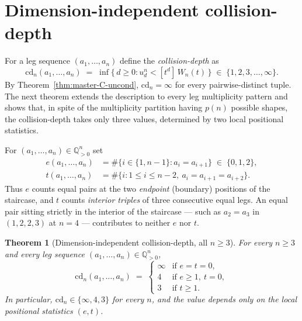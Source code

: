 \documentclass[11pt,a4paper]{article}
\newtheorem{theorem}{Theorem}
\theoremstyle{remark}
\theoremstyle{plain}
\begin{document}
\section{Dimension-independent collision-depth}\label{sec:cd}

For a leg sequence $(a_1, \ldots, a_n)$ define the
\emph{collision-depth} as
\[
\mathrm{cd}_n(a_1, \ldots, a_n)
\;=\; \inf\bigl\{\, d \ge 0 : u_d^n < [t^d]\, W_n(t) \,\bigr\}
\;\in\; \{1, 2, 3, \ldots, \infty\}.
\]
By Theorem~\ref{thm:master-C-uncond}, $\mathrm{cd}_n = \infty$ for
every pairwise-distinct tuple.  The next theorem extends the
description to every leg multiplicity pattern and shows that, in
spite of the multiplicity partition having $p(n)$ possible shapes,
the collision-depth takes only three values, determined by two
local positional statistics.

For $(a_1, \ldots, a_n) \in \mathbb{Q}_{>0}^n$ set
\begin{align*}
e(a_1, \ldots, a_n) &= \#\bigl\{ i \in \{1, n-1\} : a_i = a_{i+1}\bigr\}
\;\in\; \{0, 1, 2\}, \\
t(a_1, \ldots, a_n) &= \#\bigl\{ i : 1 \le i \le n-2,\ a_i = a_{i+1} = a_{i+2}\bigr\}.
\end{align*}
Thus $e$ counts equal pairs at the two \emph{endpoint} (boundary)
positions of the staircase, and $t$ counts \emph{interior triples}
of three consecutive equal legs.  An equal pair sitting strictly in
the interior of the staircase --- such as $a_2 = a_3$ in
$(1, 2, 2, 3)$ at $n = 4$ --- contributes to neither $e$ nor $t$.

\begin{theorem}[Dimension-independent collision-depth, all $n \ge 3$]
\label{thm:cd-general}
For every $n \ge 3$ and every leg sequence
$(a_1, \ldots, a_n) \in \mathbb{Q}_{>0}^n$,
\[
\mathrm{cd}_n(a_1, \ldots, a_n) \;=\;
\begin{cases}
\infty & \text{if } e = t = 0, \\
4 & \text{if } e \ge 1,\ t = 0, \\
3 & \text{if } t \ge 1.
\end{cases}
\]
In particular, $\mathrm{cd}_n \in \{\infty, 4, 3\}$ for every $n$,
and the value depends only on the local positional statistics $(e, t)$.
\end{theorem}
\end{document}
